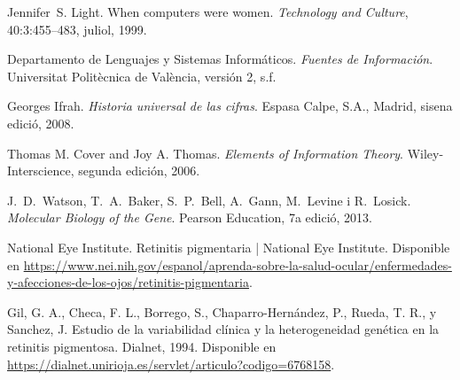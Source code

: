 \documentclass[11pt,spanish,listoffigures,listoftables]{tfgetsinf}
\begin{document}
\begin{thebibliography}{99}

   Jennifer~S. Light.
   \newblock When computers were women.
   \newblock \textit{Technology and Culture}, 40:3:455--483, juliol, 1999.

   Departamento de Lenguajes y Sistemas Informáticos.
   \newblock \textit{Fuentes de Información}.
   \newblock Universitat Politècnica de València, versión 2, s.f.
   
   Georges Ifrah.
   \newblock \textit{Historia universal de las cifras}.
   \newblock Espasa Calpe, S.A., Madrid, sisena edició, 2008.

   Thomas M. Cover and Joy A. Thomas.  
   \newblock \textit{Elements of Information Theory}.  
   \newblock Wiley-Interscience, segunda edición, 2006.

   J.~D.~Watson, T.~A.~Baker, S.~P.~Bell, A.~Gann, M.~Levine i R.~Losick.
   \newblock \textit{Molecular Biology of the Gene}.
   \newblock Pearson Education, 7a edició, 2013.


   National Eye Institute.  
   \newblock Retinitis pigmentaria | National Eye Institute.  
   \newblock Disponible en  
   \url{https://www.nei.nih.gov/espanol/aprenda-sobre-la-salud-ocular/enfermedades-y-afecciones-de-los-ojos/retinitis-pigmentaria}.

   Gil, G. A., Checa, F. L., Borrego, S., Chaparro-Hernández, P., Rueda, T. R., y Sanchez, J.  
   \newblock Estudio de la variabilidad clínica y la heterogeneidad genética en la retinitis pigmentosa.  
   \newblock Dialnet, 1994.    
   \newblock Disponible en  
   \url{https://dialnet.unirioja.es/servlet/articulo?codigo=6768158}.


\end{thebibliography}
\end{document}
